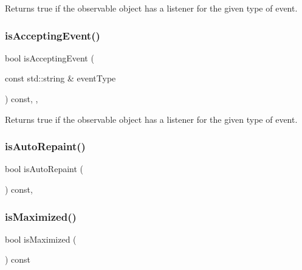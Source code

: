 Returns true if the observable object has a listener for the given type of event. 

\mbox{\label{classGObservable_a3b1c689267eda44e65a2213e7de38b23}} 
\subsubsection{\texorpdfstring{is\+Accepting\+Event()}{isAcceptingEvent()}\hspace{0.1cm}{\footnotesize\ttfamily [3/3]}}
{\footnotesize\ttfamily bool is\+Accepting\+Event (\begin{DoxyParamCaption}\item[{const std\+::string \&}]{event\+Type }\end{DoxyParamCaption}) const\hspace{0.3cm}{\ttfamily [protected]}, {\ttfamily [virtual]}, {\ttfamily [inherited]}}



Returns true if the observable object has a listener for the given type of event. 

\mbox{\label{classGForwardDrawingSurface_aa0b3b78666686fcd2a5b33a20febef0f}} 
\subsubsection{\texorpdfstring{is\+Auto\+Repaint()}{isAutoRepaint()}}
{\footnotesize\ttfamily bool is\+Auto\+Repaint (\begin{DoxyParamCaption}{ }\end{DoxyParamCaption}) const\hspace{0.3cm}{\ttfamily [virtual]}, {\ttfamily [inherited]}}

\mbox{\label{classGWindow_a28e910de88f3ff5419710b0b0a03c2bb}} 
\subsubsection{\texorpdfstring{is\+Maximized()}{isMaximized()}}
{\footnotesize\ttfamily bool is\+Maximized (\begin{DoxyParamCaption}{ }\end{DoxyParamCaption}) const\hspace{0.3cm}{\ttfamily [virtual]}}



